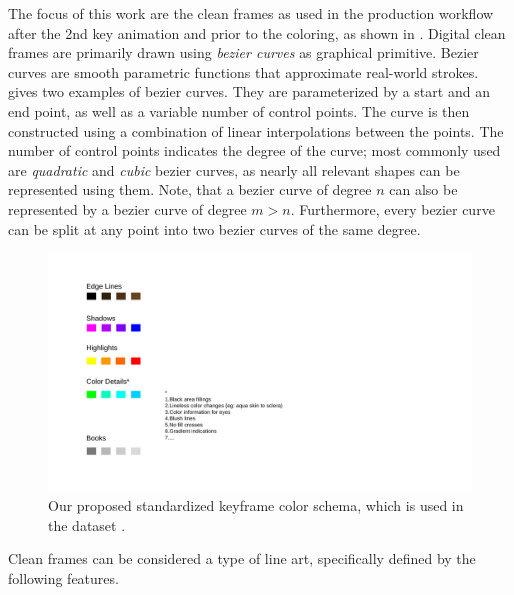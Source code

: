 The focus of this work are the clean frames as used in the production workflow after the 2nd key animation and prior to the coloring, as shown in . Digital clean frames are primarily drawn using \emph{bezier curves} \citep{de1986formes} as graphical primitive. Bezier curves are smooth parametric functions that approximate real-world strokes.  gives two examples of bezier curves. They are parameterized by a start and an end point, as well as a variable number of control points. The curve is then constructed using a combination of linear interpolations between the points. The number of control points indicates the degree of the curve; most commonly used are \emph{quadratic} and \emph{cubic} bezier curves, as nearly all relevant shapes can be represented using them. Note, that a bezier curve of degree $n$ can also be represented by a bezier curve of degree $m>n$. Furthermore, every bezier curve can be split at any point into two bezier curves of the same degree.

\begin{figure}[!h]
    \centering
    \includegraphics{graphics/Douga-Color-Schema.pdf}
    \caption{Our proposed standardized keyframe color schema, which is used in the dataset \citep{Kugler-2021}.}
    \label{fig:bg.color-schema}
\end{figure}

Clean frames can be considered a type of line art, specifically defined by the following features.

